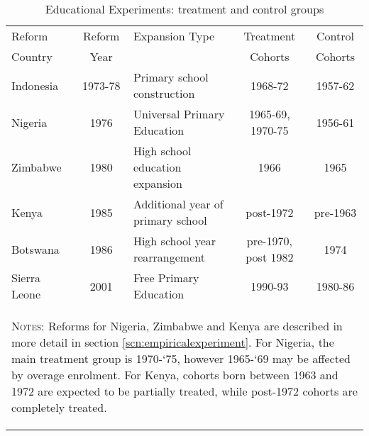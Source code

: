 \begin{table}[htpb]
\begin{center}
\caption{Educational Experiments: treatment and control groups}
\label{MMRtab:EducExp}
\begin{tabular}{lclcc}
\toprule
Reform  & Reform & Expansion Type & Treatment& Control \\
Country & Year   &                &  Cohorts & Cohorts \\ 
\midrule
Indonesia & 1973-78 & Primary school construction & 1968-72 & 1957-62  \\
Nigeria & 1976 & Universal Primary Education & 1965-69, 1970-75 & 1956-61 \\
Zimbabwe & 1980 & High school education expansion & 1966 & 1965 \\
Kenya & 1985 & Additional year of primary school & post-1972 & pre-1963 \\
Botswana & 1986 & High school year rearrangement & pre-1970, post 1982  & 1974 \\
Sierra Leone & 2001 & Free Primary Education & 1990-93 & 1980-86 \\
\bottomrule
\multicolumn{5}{p{14.5cm}}{\begin{footnotesize}\textsc{Notes:}
    Reforms for Nigeria, Zimbabwe and Kenya are described in more detail in
    section \ref{scn:empiricalexperiment}.  For Nigeria, the main treatment
    group is 1970-`75, however 1965-`69 may be affected by overage enrolment.
    For Kenya, cohorts born between 1963 and 1972 are expected to be partially
    treated, while post-1972 cohorts are completely treated.
\end{footnotesize}}
\end{tabular}
\end{center}
\end{table}

